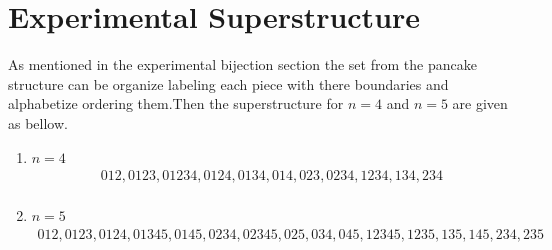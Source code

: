 \documentclass[a4paper,10pt]{article}
\begin{document}
\section{Experimental Superstructure}

As mentioned in the experimental bijection section the set from the pancake structure can be organize labeling each piece with there boundaries and alphabetize ordering them.Then the superstructure for $n=4$ and $n=5$ are given as bellow. 

\begin{enumerate}
		\item $n=4$\\
		\[
		\boxed{
		\begin{gathered}
	{012,0123,01234,0124,0134,014,023,0234,1234,134,234} \\
		\end{gathered}
		}
		\]
		\item $n=5$\\
		\[
		\boxed{
		\begin{gathered}
		{012,0123,0124,01345,0145,0234,02345,025,034,045,12345,1235,135,145,234,235}
		\end{gathered}
		}
		\]
\end{enumerate}
\end{document}
